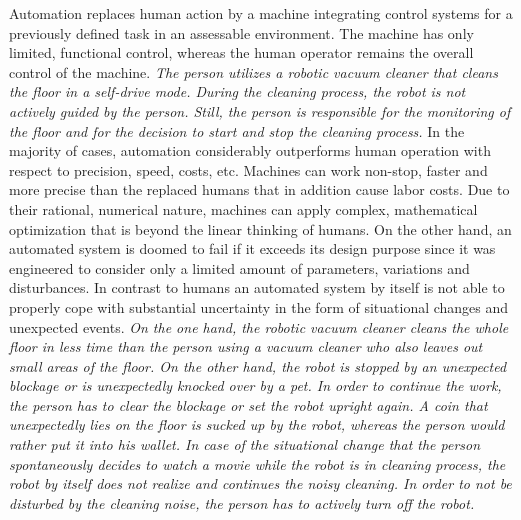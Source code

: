Automation replaces human action by a machine integrating 
control systems for a previously defined task in an assessable environment.
The machine has only limited, functional control, whereas the human operator remains the overall control of the machine.
\textit{The person utilizes a robotic vacuum cleaner that cleans the floor in a self-drive mode.
During the cleaning process, the robot is not actively guided by the person. 
Still, the person is responsible for the monitoring of the floor and for the decision to start and stop the cleaning process.}
In the majority of cases, automation considerably outperforms human operation with respect to precision, speed, costs, etc.
Machines can work non-stop, faster and more precise than the replaced humans that in addition cause labor costs.
Due to their rational, numerical nature, machines can apply complex, mathematical optimization that is beyond the linear thinking of humans.
On the other hand, an automated system is doomed to fail if it exceeds its design purpose since
it was engineered to consider only a limited amount of parameters, variations and disturbances.
In contrast to humans an automated system by itself is not able to properly cope with substantial uncertainty in the form
of situational changes and unexpected events.
\textit{On the one hand, the robotic vacuum cleaner cleans the whole floor in less time than the person using a vacuum cleaner 
who also leaves out small areas of the floor. 
On the other hand, the robot is stopped by an unexpected blockage or is unexpectedly knocked over by a pet.
In order to continue the work, the person has to clear the blockage or set the robot upright again.
A coin that unexpectedly lies on the floor is sucked up by the robot, whereas the person would rather put it into his wallet.
In case of the situational change
that the person spontaneously decides to watch a movie while the robot is in cleaning process,
the robot by itself does not realize and continues the noisy cleaning.
In order to not be disturbed by the cleaning noise, the person has to actively turn off the robot.}

